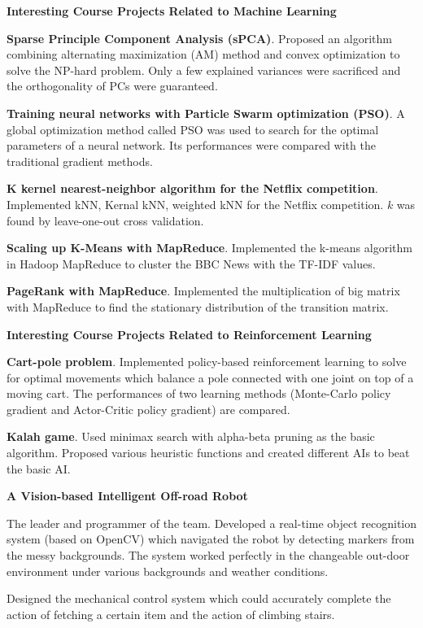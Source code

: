 \documentclass[margin,line,11pt]{resume}
\begin{document}
\begin{resume}
\textbf{Interesting Course Projects Related to Machine Learning}
\begin{list2}
\item \textbf{Sparse Principle Component Analysis (sPCA)}. Proposed an algorithm combining alternating maximization (AM) method and convex optimization to solve the NP-hard problem. Only a few explained variances were sacrificed and the orthogonality of PCs were guaranteed. 
\item \textbf{Training neural networks with Particle Swarm optimization (PSO)}. A global optimization method called PSO was used to search for the optimal parameters of a neural network.  Its performances were compared with the traditional gradient methods.
\item \textbf{K kernel nearest-neighbor algorithm for the Netflix competition}. Implemented kNN, Kernal kNN, weighted kNN for the Netflix competition. $k$ was found by leave-one-out cross validation. 
\item \textbf{Scaling up K-Means with MapReduce}. Implemented the k-means algorithm in Hadoop MapReduce to cluster the BBC News with the TF-IDF values.
\item \textbf{PageRank with MapReduce}. Implemented the multiplication of big matrix with MapReduce to find the stationary distribution of the transition  matrix. 
\end{list2}


\textbf{Interesting Course Projects Related to Reinforcement Learning}
\begin{list2}        
\item \textbf{Cart-pole problem}. Implemented policy-based reinforcement learning  to solve for optimal movements which balance a pole connected with one joint on top of a moving cart. The performances of two learning methods (Monte-Carlo policy gradient and Actor-Critic policy gradient) are compared. 
\item \textbf{Kalah game}. Used minimax search with alpha-beta pruning as the basic algorithm. Proposed various heuristic functions and created different AIs to beat the basic AI. 
\end{list2}



\textbf{A Vision-based Intelligent Off-road Robot}
\begin{list2}
\item The leader and programmer of the team. Developed a real-time object recognition system (based on OpenCV) which navigated the robot by detecting  markers from the messy backgrounds. The system worked perfectly in the changeable out-door environment under various backgrounds and  weather conditions.
\item Designed the mechanical control system which could accurately complete the action of fetching a certain item and the action of climbing stairs.
\end{list2}






    	

 	

 	       
\end{resume}   
\end{document}
